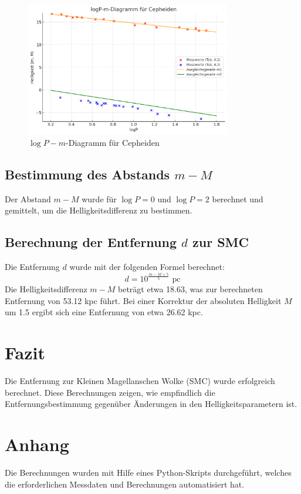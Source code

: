 \documentclass[a4paper, 12pt]{article}
\begin{document}
\begin{figure}[H]
    \centering
    \includegraphics[width=0.8\textwidth]{plot.png} %
    \caption{\(\log P - m\)-Diagramm für Cepheiden}
    \label{fig:logP-m}
\end{figure}

\subsection{Bestimmung des Abstands \(m - M\)}
Der Abstand \(m - M\) wurde für \(\log P = 0\) und \(\log P = 2\) berechnet und gemittelt, um die Helligkeitsdifferenz zu bestimmen.

\subsection{Berechnung der Entfernung \(d\) zur SMC}
Die Entfernung \(d\) wurde mit der folgenden Formel berechnet:
\begin{equation}
    d = 10^{\frac{m - M + 5}{5}} \text{ pc}
\end{equation}
Die Helligkeitsdifferenz \(m - M\) beträgt etwa 18.63, was zur berechneten Entfernung von 53.12 kpc führt. Bei einer Korrektur der absoluten Helligkeit \(M\) um 1.5 ergibt sich eine Entfernung von etwa 26.62 kpc.

\section{Fazit}
Die Entfernung zur Kleinen Magellanschen Wolke (SMC) wurde erfolgreich berechnet. Diese Berechnungen zeigen, wie empfindlich die Entfernungsbestimmung gegenüber Änderungen in den Helligkeitsparametern ist.
\section*{Anhang}
Die Berechnungen wurden mit Hilfe eines Python-Skripts durchgeführt, welches die erforderlichen Messdaten und Berechnungen automatisiert hat.
\end{document}
